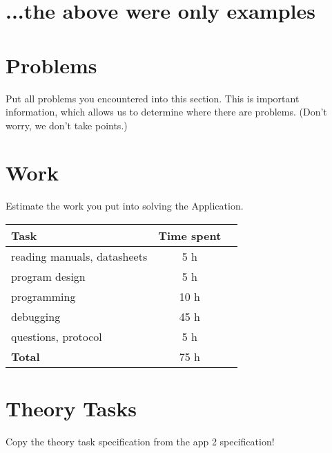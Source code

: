 \documentclass[12pt,a4paper,titlepage,oneside]{article}
\begin{document}
\section{...the above were only examples}


\section{Problems}

Put all problems you encountered into this section.
This is important information, which allows us to determine where there are
problems.
(Don't worry, we don't take points.)


\section{Work}

Estimate the work you put into solving the Application.

\begin{tabular}{|l|c|c|}\hline
	Task & Time spent \\ \hline

	reading manuals, datasheets &  5 h\\
	program design              &  5 h\\
	programming                 & 10 h\\
	debugging                   & 45 h\\
	questions, protocol         &  5 h\\ \hline

	\textbf{Total}              & 75 h\\ \hline
\end{tabular}



\section{Theory Tasks}
Copy the theory task specification from the app 2 specification!





\newpage
\end{document}
